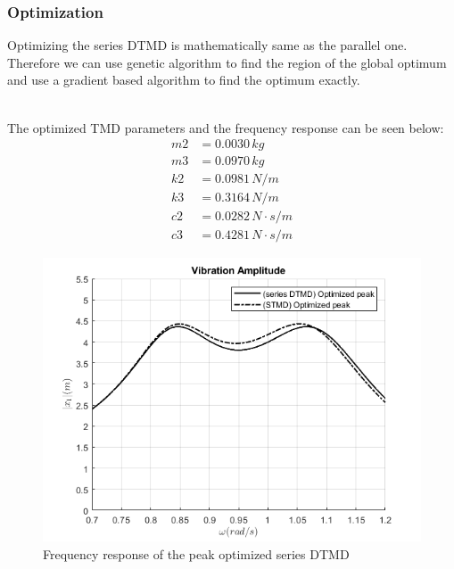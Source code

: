 \subsubsection{Optimization}
Optimizing the series DTMD is mathematically same as the parallel one. Therefore we can use genetic algorithm to find the region of the global optimum and use a gradient based algorithm to find the optimum exactly.\\
\\
\par The optimized TMD parameters and the frequency response can be seen below:
\begin{align*}
    m2 &= 0.0030 \,kg\\
    m3 &= 0.0970 \,kg\\
    k2 &= 0.0981 \,N/m\\
    k3 &= 0.3164 \,N/m\\
    c2 &= 0.0282 \,N\cdot s/m\\
    c3 &= 0.4281 \,N\cdot s/m
\end{align*}
\begin{figure}[ht]
    \centering
    \includegraphics[scale = 0.6]{MATLAB Figures/series DTMD.png}
    \caption{Frequency response of the peak optimized series DTMD}
    \label{fig:freq_sTMD}
\end{figure}